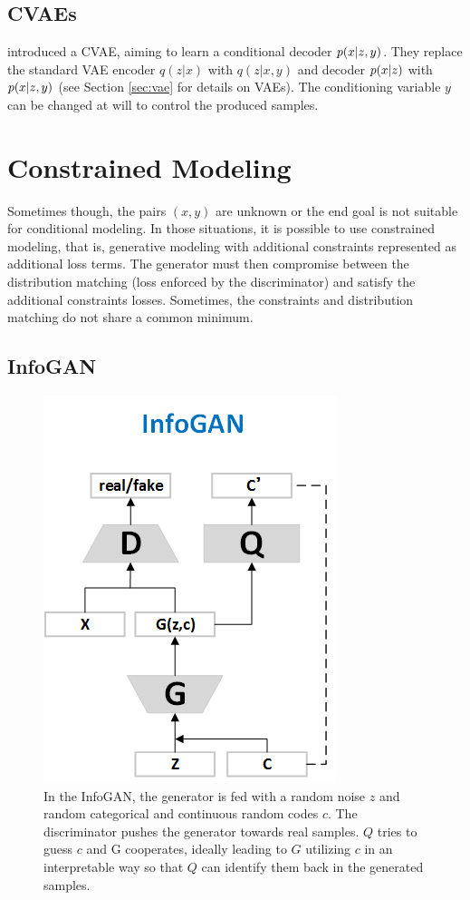\subsection{\acfp{CVAE}}

\citet{cvae} introduced a \ac{CVAE}, aiming to learn a conditional decoder $p(x|z,y)$. They replace the standard \ac{VAE} encoder $q(z|x)$ with $q(z|x, y)$ and decoder $p(x|z)$ with $p(x|z,y)$ (see Section \ref{sec:vae} for details on \acp{VAE}). The conditioning variable $y$ can be changed at will to control the produced samples.

\section{Constrained Modeling}

Sometimes though, the pairs $(x, y)$ are unknown or the end goal is not suitable for conditional modeling. In those situations, it is possible to use constrained modeling, that is, generative modeling with additional constraints represented as additional loss terms. The generator must then compromise between the distribution matching (loss enforced by the discriminator) and satisfy the additional constraints losses. Sometimes, the constraints and distribution matching do not share a common minimum.

\subsection{InfoGAN}

\begin{figure}
    \centering
    \includegraphics[width=0.3\columnwidth]{60-files/infogan.png}
    \caption{In the InfoGAN, the generator is fed with a random noise $z$ and random categorical and continuous random codes $c$. The discriminator pushes the generator towards real samples. $Q$ tries to guess $c$ and G cooperates, ideally leading to $G$ utilizing $c$ in an interpretable way so that $Q$ can identify them back in the generated samples.}
    \label{fig:infogan}
\end{figure}

